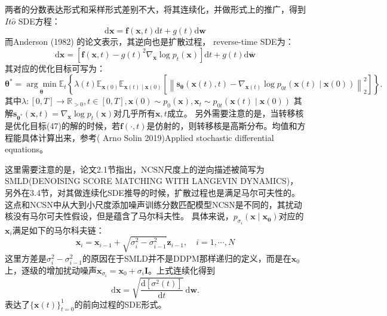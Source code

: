 \documentclass[lang=cn,newtx,10pt,scheme=chinese]{elegantbook}
\begin{document}
两者的分数表达形式和采样形式差别不大，将其连续化，并做形式上的推广，得到$It\hat{o}$ SDE方程：
\begin{equation}
\mathrm{d} \mathbf{x}=\mathbf{f}(\mathbf{x}, t) \mathrm{d} t+g(t) \mathrm{d} \mathbf{w}
\end{equation}
而Anderson (1982) 的论文表示，其逆向也是扩散过程， reverse-time SDE为：
\begin{equation}
\mathrm{d} \mathbf{x}=\left[\mathbf{f}(\mathbf{x}, t)-g(t)^2 \nabla_{\mathbf{x}} \log p_t(\mathbf{x})\right] \mathrm{d} t+g(t) \mathrm{d} \overline{\mathbf{w}}
\end{equation}
其对应的优化目标可写为：
\begin{equation}
\boldsymbol{\theta}^*=\underset{\boldsymbol{\theta}}{\arg \min } \mathbb{E}_t\left\{\lambda(t) \mathbb{E}_{\mathbf{x}(0)} \mathbb{E}_{\mathbf{x}(t) \mid \mathbf{x}(0)}\left[\left\|\mathbf{s}_{\boldsymbol{\theta}}(\mathbf{x}(t), t)-\nabla_{\mathbf{x}(t)} \log p_{0 t}(\mathbf{x}(t) \mid \mathbf{x}(0))\right\|_2^2\right]\right\} .
\end{equation}
其中$\lambda:[0, T] \rightarrow \mathbb{R}_{>0}, t\in [0, T], \mathbf{x}(0) \sim p_0(\mathbf{x}), \mathbf{x}_t \sim p_{0t}(\mathbf{x}(t) \mid \mathbf{x}(0))$
其解$\mathbf{s}_{\boldsymbol{\theta}^*}\left(\mathbf{x}, t\right)=\nabla_{\mathbf{x}} \log p_{t}(\mathbf{x})$对几乎所有$\mathbf{x}, t$成立。
另外需要注意的是，当转移核是优化目标(47)的解的时候，若$\mathbf{f}(\cdot, t)$是仿射的，则转移核是高斯分布。均值和方程能具体计算出来，参考( Arno Solin 2019)Applied stochastic differential equations。

这里需要注意的是，论文2.1节指出，NCSN尺度上的逆向描述被简写为SMLD(DENOISING SCORE MATCHING WITH LANGEVIN  DYNAMICS)，另外在3.4节，对其做连续化SDE推导的时候，扩散过程也是满足马尔可夫性的。这点和NCSN中从大到小尺度添加噪声训练分数匹配模型NCSN是不同的，其扰动核没有马尔可夫性假设，但是蕴含了马尔科夫性。
具体来说，$p_{\sigma_i}(\mathbf{x} \mid \mathbf{x_0})$对应的$\mathbf{x}_i$满足如下的马尔科夫链：
\begin{equation}
\mathbf{x}_i=\mathbf{x}_{i-1}+\sqrt{\sigma_i^2-\sigma_{i-1}^2} \mathbf{z}_{i-1}, \quad i=1, \cdots, N
\end{equation}
这里方差是$\sigma_i^2-\sigma_{i-1}^2$的原因在于SMLD并不是DDPM那样递归的定义，而是在$\mathbf{x}_0$上，逐级的增加扰动噪声$\mathbf{x}_{\sigma_i}=\mathbf{x}_0+\sigma_i \mathbf{I}$。上式连续化得到
\begin{equation}
\mathrm{d} \mathbf{x}=\sqrt{\frac{\mathrm{d}\left[\sigma^2(t)\right]}{\mathrm{d} t}} \mathrm{~d} \mathbf{w} .
\end{equation}
表达了$\{\mathbf{x}(t)\}^{1}_{t=0}$的前向过程的SDE形式。
\end{document}
